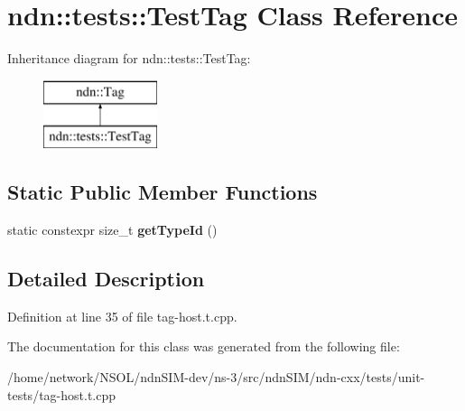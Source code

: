 \hypertarget{classndn_1_1tests_1_1TestTag}{}\section{ndn\+:\+:tests\+:\+:Test\+Tag Class Reference}
\label{classndn_1_1tests_1_1TestTag}
Inheritance diagram for ndn\+:\+:tests\+:\+:Test\+Tag\+:\begin{figure}[H]
\begin{center}
\leavevmode
\includegraphics[height=2.000000cm]{classndn_1_1tests_1_1TestTag}
\end{center}
\end{figure}
\subsection*{Static Public Member Functions}
\begin{DoxyCompactItemize}
\item 
static constexpr size\+\_\+t {\bfseries get\+Type\+Id} ()\hypertarget{classndn_1_1tests_1_1TestTag_a0c5cf230d36d90615d9aaeed06d4b983}{}\label{classndn_1_1tests_1_1TestTag_a0c5cf230d36d90615d9aaeed06d4b983}

\end{DoxyCompactItemize}


\subsection{Detailed Description}


Definition at line 35 of file tag-\/host.\+t.\+cpp.



The documentation for this class was generated from the following file\+:\begin{DoxyCompactItemize}
\item 
/home/network/\+N\+S\+O\+L/ndn\+S\+I\+M-\/dev/ns-\/3/src/ndn\+S\+I\+M/ndn-\/cxx/tests/unit-\/tests/tag-\/host.\+t.\+cpp\end{DoxyCompactItemize}
